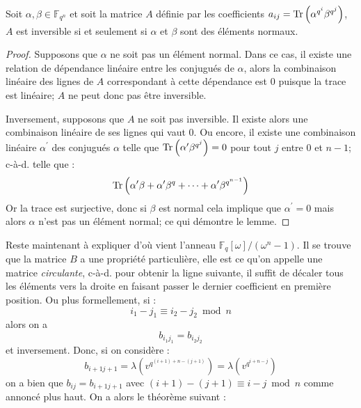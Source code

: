 \documentclass[a4paper]{article} %
\numberwithin{section}{part}
\numberwithin{equation}{section}
\newcommand\GF[1]{\mathbb{F}_{#1}}
\newcommand\Tr[1]{\textup{Tr}\left(#1\right)}
\begin{document}
\begin{lem}
\label{lem:mattrinv}
Soit $\alpha,\beta\in\GF{q^n}$ et soit la matrice $A$ définie par les 
coefficients $a_{ij} = \Tr{\alpha^{q^i}\beta^{q^j}}$, $A$ est inversible si et 
seulement si $\alpha$ et $\beta$ sont des éléments normaux.
\end{lem}
\begin{proof}
Supposons que $\alpha$ ne soit pas un élément normal. Dans ce cas, il existe une
relation de dépendance linéaire entre les conjugués de $\alpha$, alors la 
combinaison linéaire des lignes de $A$ correspondant à cette dépendance est $0$
puisque la trace est linéaire; $A$ ne peut donc pas être inversible.\par
Inversement, supposons que $A$ ne soit pas inversible. Il existe alors une 
combinaison linéaire de ses lignes qui vaut $0$. Ou encore, il existe une 
combinaison linéaire $\alpha^{\prime}$ des conjugués $\alpha$ telle que 
$\Tr{\alpha^{\prime}\beta^{q^j}} = 0$ pour tout $j$ entre $0$ et $n-1$; 
c-à-d. telle que :
\[\Tr{\alpha^{\prime}\beta + \alpha^{\prime}\beta^q + \dots + 
\alpha^{\prime}\beta^{q^{n-1}}}\]
Or la trace est surjective, donc si $\beta$ est normal cela implique que 
$\alpha^{\prime} = 0$ mais alors $\alpha$ n'est pas un élément normal; ce qui 
démontre le lemme.
\end{proof}
Reste maintenant à expliquer d'où vient l'anneau 
$\mathbb{F}_q[\omega]/(\omega^n - 1)$. Il se trouve que la matrice $B$ a une 
propriété particulière, elle est ce qu'on appelle une matrice \emph{circulante},
c-à-d. pour obtenir la ligne suivante, il suffit de décaler tous les 
éléments vers la droite en faisant passer le dernier coefficient en première 
position. Ou plus formellement, si :
\[i_1 - j_1 \equiv i_2 - j_2 \bmod n\]
alors on a 
\[b_{i_1j_1} = b_{i_2j_2}\]
et inversement. Donc, si on considère :
\[b_{i+1j+1} = \lambda\left(v^{q^{(i+1) + n - (j+1)}}\right) = 
\lambda\left(v^{q^{i+n-j}}\right)\]
on a bien que $b_{ij} = b_{i+1j+1}$ avec $(i+1) - (j+1) \equiv i - j \bmod n$ 
comme annoncé plus haut. On a alors le théorème suivant :
\end{document}
